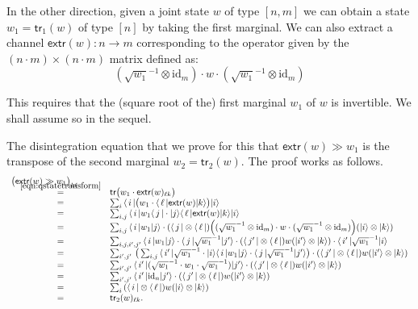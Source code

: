 \documentclass[leqno]{tufte-book} %
\newcommand{\tr}{\mathsf{tr}}
\newcommand{\extr}{\mathsf{extr}}
\newcommand{\ket}[1]{\ensuremath{|#1\rangle}}
\newcommand{\bra}[1]{\langle\,#1\,|}
\newcommand{\idmap}[1][]{\ensuremath{\mathrm{id}_{#1}}}
\begin{document}
{In the other direction, given a joint state $w$ of type $[n,m]$ we can
obtain a state $w_{1} = \tr_{1}(w)$ of type $[n]$ by taking the first
marginal.  We can also extract a channel $\extr(w) \colon n
\rightarrow m$ corresponding to the operator given by the $(n\cdot
m)\times(n\cdot m)$ matrix defined as:
$$(\sqrt{w_{1}}^{-1}\otimes\idmap[m]) \cdot w \cdot 
   (\sqrt{w_{1}}^{-1}\otimes\idmap[m])$$

\noindent This requires that the (square root of the) first marginal
$w_1$ of $w$ is invertible. We shall assume so in the sequel.

The disintegration equation that we prove for this that $\extr(w) \gg
w_{1}$ is the transpose of the second marginal $w_{2} = \tr_{2}(w)$.
The proof works as follows.
$$\begin{array}{rcl}
\lefteqn{\big(\extr(w) \gg w_{1}\big)_{k\ell}} 
\\
& \smash{\stackrel{\eqref{eqn:qstatetransform}}{=}} &
\tr\big(w_{1} \cdot \extr(w)_{\ell k}\big)
\\
& = &
\sum_{i}\, \bra{i}\big(w_{1} \cdot \bra{\ell}\extr(w)\ket{k}\big)\ket{i}
\\
& = &
\sum_{i,j}\, \bra{i}w_{1}\bra{j} \cdot \ket{j}\bra{\ell}\extr(w)\ket{k}\ket{i}
\\
& = &
\sum_{i,j}\, \bra{i}w_{1}\ket{j} \cdot 
   (\bra{j}\otimes\bra{\ell})\Big((\sqrt{w_{1}}^{-1}\otimes\idmap[m]) \cdot 
   w \cdot (\sqrt{w_{1}}^{-1}\otimes\idmap[m])\Big)(\ket{i}\otimes\ket{k})
\\
& = &
\sum_{i,j,i',j'}\, \bra{i}w_{1}\ket{j} \cdot \bra{j}\sqrt{w_{1}}^{-1}\ket{j'} 
   \cdot  (\bra{j'}\otimes\bra{\ell})w(\ket{i'}\otimes\ket{k}) \cdot 
   \bra{i'}\sqrt{w_{1}}^{-1}\ket{i}
\\
& = &
\sum_{i',j'}\, \big(\sum_{i,j}\,\bra{i'}\sqrt{w_{1}}^{-1} \cdot 
   \ket{i}\bra{i}w_{1}\ket{j} \cdot \bra{j}\sqrt{w_{1}}^{-1}\ket{j'}\big)
   \cdot  (\bra{j'}\otimes\bra{\ell})w(\ket{i'}\otimes\ket{k})
\\
& = &
\sum_{i',j'}\, \bra{i'}(\sqrt{w_{1}}^{-1} \cdot w_{1} \cdot 
   \sqrt{w_{1}}^{-1})\ket{j'}
   \cdot  (\bra{j'}\otimes\bra{\ell})w(\ket{i'}\otimes\ket{k})
\\
& = &
\sum_{i',j'}\, \bra{i'}\idmap[n]\ket{j'}
   \cdot  (\bra{j'}\otimes\bra{\ell})w(\ket{i'}\otimes\ket{k})
\\
& = &
\sum_{i}\, (\bra{i}\otimes\bra{\ell})w(\ket{i}\otimes\ket{k})
\\
& = &
\tr_{2}(w)_{\ell k}.
\end{array}$$


}
\end{document}
